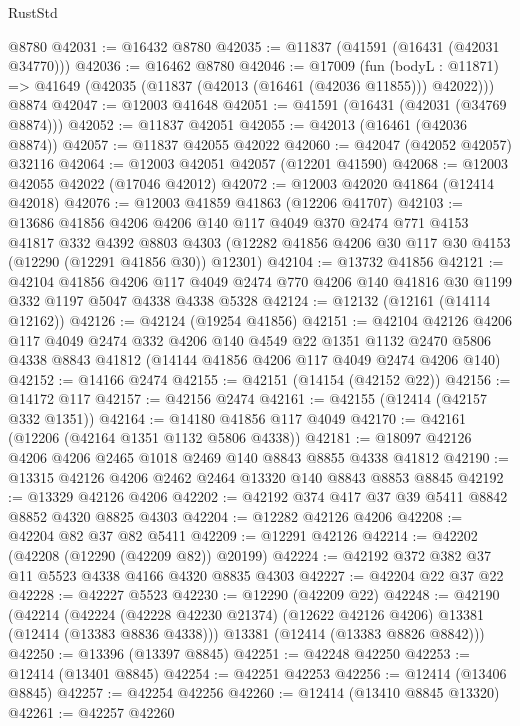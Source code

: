 \begin{lexlean}{RustStd}
\begin{coremodule}
{\begin{coremodule}
{{{{{{{{{{{{{{{{{{{{{{{{{{{{{{{{{{{{{{{{{{{{{{{{{{    @8780
@42031 := @16432 @8780
@42035 := @11837 (@41591 (@16431 (@42031 @34770)))
@42036 := @16462 @8780
@42046 := @17009
    (fun (bodyL : @11871) => @41649 (@42035 (@11837 (@42013 (@16461 (@42036 @11855))) @42022)))
    @8874
@42047 := @12003 @41648
@42051 := @41591 (@16431 (@42031 (@34769 @8874)))
@42052 := @11837 @42051
@42055 := @42013 (@16461 (@42036 @8874))
@42057 := @11837 @42055 @42022
@42060 := @42047 (@42052 @42057) @32116
@42064 := @12003 @42051 @42057 (@12201 @41590)
@42068 := @12003 @42055 @42022 (@17046 @42012)
@42072 := @12003 @42020 @41864 (@12414 @42018)
@42076 := @12003 @41859 @41863 (@12206 @41707)
@42103 := @13686
    @41856
    @4206
    @4206
    @140
    @117
    @4049
    @370
    @2474
    @771
    @4153
    @41817
    @332
    @4392
    @8803
    @4303
    (@12282 @41856 @4206 @30 @117 @30 @4153 (@12290 (@12291 @41856 @30)) @12301)
@42104 := @13732 @41856
@42121 := @42104
    @41856
    @4206
    @117
    @4049
    @2474
    @770
    @4206
    @140
    @41816
    @30
    @1199
    @332
    @1197
    @5047
    @4338
    @4338
    @5328
@42124 := @12132 (@12161 (@14114 @12162))
@42126 := @42124 (@19254 @41856)
@42151 := @42104
    @42126
    @4206
    @117
    @4049
    @2474
    @332
    @4206
    @140
    @4549
    @22
    @1351
    @1132
    @2470
    @5806
    @4338
    @8843
    @41812
    (@14144 @41856 @4206 @117 @4049 @2474 @4206 @140)
@42152 := @14166 @2474
@42155 := @42151 (@14154 (@42152 @22))
@42156 := @14172 @117
@42157 := @42156 @2474
@42161 := @42155 (@12414 (@42157 @332 @1351))
@42164 := @14180 @41856 @117 @4049
@42170 := @42161 (@12206 (@42164 @1351 @1132 @5806 @4338))
@42181 := @18097 @42126 @4206 @4206 @2465 @1018 @2469 @140 @8843 @8855 @4338 @41812
@42190 := @13315 @42126 @4206 @2462 @2464 @13320 @140 @8843 @8853 @8845
@42192 := @13329 @42126 @4206
@42202 := @42192 @374 @417 @37 @39 @5411 @8842 @8852 @4320 @8825 @4303
@42204 := @12282 @42126 @4206
@42208 := @42204 @82 @37 @82 @5411
@42209 := @12291 @42126
@42214 := @42202 (@42208 (@12290 (@42209 @82)) @20199)
@42224 := @42192 @372 @382 @37 @11 @5523 @4338 @4166 @4320 @8835 @4303
@42227 := @42204 @22 @37 @22
@42228 := @42227 @5523
@42230 := @12290 (@42209 @22)
@42248 := @42190
    (@42214
      (@42224 (@42228 @42230 @21374) (@12622 @42126 @4206) @13381 (@12414 (@13383 @8836 @4338)))
      @13381
      (@12414 (@13383 @8826 @8842)))
@42250 := @13396 (@13397 @8845)
@42251 := @42248 @42250
@42253 := @12414 (@13401 @8845)
@42254 := @42251 @42253
@42256 := @12414 (@13406 @8845)
@42257 := @42254 @42256
@42260 := @12414 (@13410 @8845 @13320)
@42261 := @42257 @42260
}}}}}}}}}}}}}}}}}}}}}}}}}}}}}}}}}}}}}}}}}}}}}}}}}}
\end{coremodule}}
\end{coremodule}
\end{lexlean}
